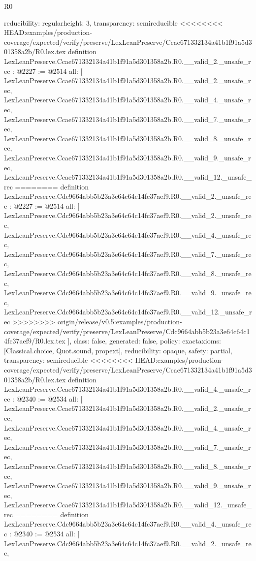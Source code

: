 \begin{lexlean}{R0}
\begin{coremodule}
{{{{{{{{{{{{{{{{{{{{{{{{{{{{{{{{{{{{{{{{{{{{{{{{{{  reducibility: regular{height: 3},
  transparency: semireducible
}
<<<<<<<< HEAD:examples/production-coverage/expected/verify/preserve/LexLeanPreserve/Ccae671332134a41b1f91a5d301358a2b/R0.lex.tex
definition LexLeanPreserve.Ccae671332134a41b1f91a5d301358a2b.R0.__valid_2._unsafe_rec : @2227 := @2514 {
  all: [
    LexLeanPreserve.Ccae671332134a41b1f91a5d301358a2b.R0.__valid_2._unsafe_rec,
    LexLeanPreserve.Ccae671332134a41b1f91a5d301358a2b.R0.__valid_4._unsafe_rec,
    LexLeanPreserve.Ccae671332134a41b1f91a5d301358a2b.R0.__valid_7._unsafe_rec,
    LexLeanPreserve.Ccae671332134a41b1f91a5d301358a2b.R0.__valid_8._unsafe_rec,
    LexLeanPreserve.Ccae671332134a41b1f91a5d301358a2b.R0.__valid_9._unsafe_rec,
    LexLeanPreserve.Ccae671332134a41b1f91a5d301358a2b.R0.__valid_12._unsafe_rec
========
definition LexLeanPreserve.Cdc9664abb5b23a3e64c64c14fc37aef9.R0.__valid_2._unsafe_rec : @2227 := @2514 {
  all: [
    LexLeanPreserve.Cdc9664abb5b23a3e64c64c14fc37aef9.R0.__valid_2._unsafe_rec,
    LexLeanPreserve.Cdc9664abb5b23a3e64c64c14fc37aef9.R0.__valid_4._unsafe_rec,
    LexLeanPreserve.Cdc9664abb5b23a3e64c64c14fc37aef9.R0.__valid_7._unsafe_rec,
    LexLeanPreserve.Cdc9664abb5b23a3e64c64c14fc37aef9.R0.__valid_8._unsafe_rec,
    LexLeanPreserve.Cdc9664abb5b23a3e64c64c14fc37aef9.R0.__valid_9._unsafe_rec,
    LexLeanPreserve.Cdc9664abb5b23a3e64c64c14fc37aef9.R0.__valid_12._unsafe_rec
>>>>>>>> origin/release/v0.5:examples/production-coverage/expected/verify/preserve/LexLeanPreserve/Cdc9664abb5b23a3e64c64c14fc37aef9/R0.lex.tex
  ],
  class: false,
  generated: false,
  policy: exact{axioms: [Classical.choice, Quot.sound, propext]},
  reducibility: opaque{},
  safety: partial,
  transparency: semireducible
}
<<<<<<<< HEAD:examples/production-coverage/expected/verify/preserve/LexLeanPreserve/Ccae671332134a41b1f91a5d301358a2b/R0.lex.tex
definition LexLeanPreserve.Ccae671332134a41b1f91a5d301358a2b.R0.__valid_4._unsafe_rec : @2340 := @2534 {
  all: [
    LexLeanPreserve.Ccae671332134a41b1f91a5d301358a2b.R0.__valid_2._unsafe_rec,
    LexLeanPreserve.Ccae671332134a41b1f91a5d301358a2b.R0.__valid_4._unsafe_rec,
    LexLeanPreserve.Ccae671332134a41b1f91a5d301358a2b.R0.__valid_7._unsafe_rec,
    LexLeanPreserve.Ccae671332134a41b1f91a5d301358a2b.R0.__valid_8._unsafe_rec,
    LexLeanPreserve.Ccae671332134a41b1f91a5d301358a2b.R0.__valid_9._unsafe_rec,
    LexLeanPreserve.Ccae671332134a41b1f91a5d301358a2b.R0.__valid_12._unsafe_rec
========
definition LexLeanPreserve.Cdc9664abb5b23a3e64c64c14fc37aef9.R0.__valid_4._unsafe_rec : @2340 := @2534 {
  all: [
    LexLeanPreserve.Cdc9664abb5b23a3e64c64c14fc37aef9.R0.__valid_2._unsafe_rec,
}}}}}}}}}}}}}}}}}}}}}}}}}}}}}}}}}}}}}}}}}}}}}}}}}}}}
\end{coremodule}
\end{lexlean}
